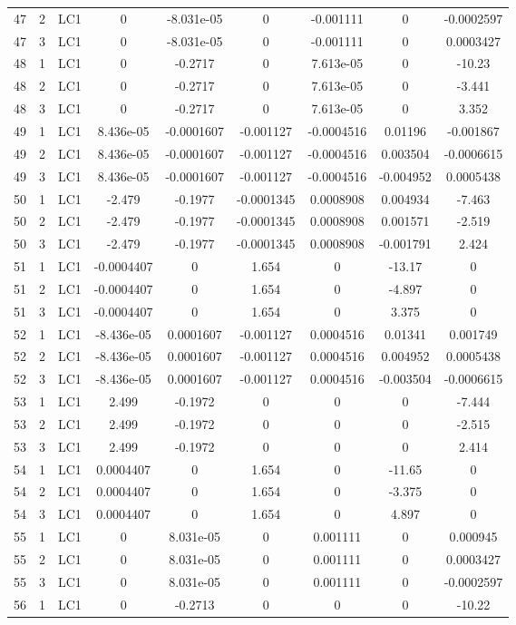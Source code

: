 \documentclass{article}%
\begin{document}
\begin{longtable}{| c c c | c c c c c c |}
47&2&LC1&0&{-}8.031e{-}05&0&{-}0.001111&0&{-}0.0002597\\%
47&3&LC1&0&{-}8.031e{-}05&0&{-}0.001111&0&0.0003427\\%
48&1&LC1&0&{-}0.2717&0&7.613e{-}05&0&{-}10.23\\%
48&2&LC1&0&{-}0.2717&0&7.613e{-}05&0&{-}3.441\\%
48&3&LC1&0&{-}0.2717&0&7.613e{-}05&0&3.352\\%
49&1&LC1&8.436e{-}05&{-}0.0001607&{-}0.001127&{-}0.0004516&0.01196&{-}0.001867\\%
49&2&LC1&8.436e{-}05&{-}0.0001607&{-}0.001127&{-}0.0004516&0.003504&{-}0.0006615\\%
49&3&LC1&8.436e{-}05&{-}0.0001607&{-}0.001127&{-}0.0004516&{-}0.004952&0.0005438\\%
50&1&LC1&{-}2.479&{-}0.1977&{-}0.0001345&0.0008908&0.004934&{-}7.463\\%
50&2&LC1&{-}2.479&{-}0.1977&{-}0.0001345&0.0008908&0.001571&{-}2.519\\%
50&3&LC1&{-}2.479&{-}0.1977&{-}0.0001345&0.0008908&{-}0.001791&2.424\\%
51&1&LC1&{-}0.0004407&0&1.654&0&{-}13.17&0\\%
51&2&LC1&{-}0.0004407&0&1.654&0&{-}4.897&0\\%
51&3&LC1&{-}0.0004407&0&1.654&0&3.375&0\\%
52&1&LC1&{-}8.436e{-}05&0.0001607&{-}0.001127&0.0004516&0.01341&0.001749\\%
52&2&LC1&{-}8.436e{-}05&0.0001607&{-}0.001127&0.0004516&0.004952&0.0005438\\%
52&3&LC1&{-}8.436e{-}05&0.0001607&{-}0.001127&0.0004516&{-}0.003504&{-}0.0006615\\%
53&1&LC1&2.499&{-}0.1972&0&0&0&{-}7.444\\%
53&2&LC1&2.499&{-}0.1972&0&0&0&{-}2.515\\%
53&3&LC1&2.499&{-}0.1972&0&0&0&2.414\\%
54&1&LC1&0.0004407&0&1.654&0&{-}11.65&0\\%
54&2&LC1&0.0004407&0&1.654&0&{-}3.375&0\\%
54&3&LC1&0.0004407&0&1.654&0&4.897&0\\%
55&1&LC1&0&8.031e{-}05&0&0.001111&0&0.000945\\%
55&2&LC1&0&8.031e{-}05&0&0.001111&0&0.0003427\\%
55&3&LC1&0&8.031e{-}05&0&0.001111&0&{-}0.0002597\\%
56&1&LC1&0&{-}0.2713&0&0&0&{-}10.22\\%

\end{longtable}
\end{document}
